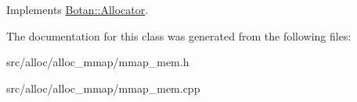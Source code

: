 Implements \hyperlink{classBotan_1_1Allocator_aa3ade8ade033625cf1e4a790a72eea1e}{Botan\-::\-Allocator}.



The documentation for this class was generated from the following files\-:\begin{DoxyCompactItemize}
\item 
src/alloc/alloc\-\_\-mmap/mmap\-\_\-mem.\-h\item 
src/alloc/alloc\-\_\-mmap/mmap\-\_\-mem.\-cpp\end{DoxyCompactItemize}
